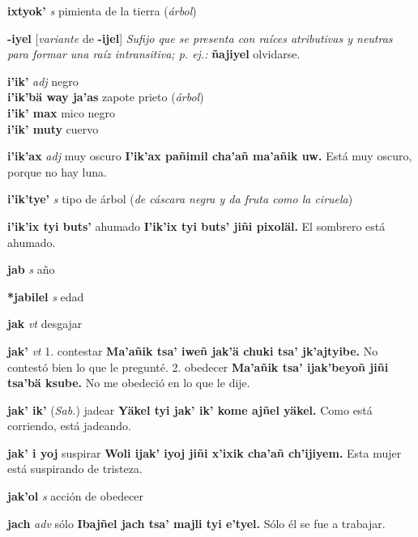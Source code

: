 \documentclass[10pt]{scrbook}
\newcommand{\entry}[1]{\textbf{#1}}
\newcommand{\alphaletter}[1]{\end{multicols}\addsec{#1}\begin{multicols}{2}}
\newcommand{\onedefinition}[1]{#1.}
\newcommand{\nontranslationdef}[1]{\textit{#1}}
\newcommand{\partofspeech}[1]{\textit{#1}}
\newcommand{\spanishtranslation}[1]{#1}
\newcommand{\clarification}[1]{(\textit{#1})}
\newcommand{\cholexample}[1]{\textbf{#1}}
\newcommand{\exampletranslation}[1]{#1}
\newcommand{\relevantdialect}[1]{(\textit{#1})}
\newcommand{\secondaryentry}[1]{\\\textbf{#1}}
\newcommand{\secondtranslation}[1]{#1}
\newcommand{\conjugationtense}[1]{[\textit{#1}}
\newcommand{\conjugationverb}[1]{de \textbf{#1}]}
\begin{document}
\begin{multicols}{2}
\entry{ixtyok'}
\partofspeech{s}
\spanishtranslation{pimienta de la tierra}
\clarification{árbol}

\entry{-iyel}
\conjugationtense{variante}
\conjugationverb{-ijel}
\nontranslationdef{Sufijo que se presenta con raíces atributivas y neutras para formar una raíz intransitiva; p. ej.:}
\cholexample{ñajiyel}
\exampletranslation{olvidarse.}

\entry{i'ik'}
\partofspeech{adj}
\spanishtranslation{negro}
\secondaryentry{i'ik'bä way ja'as}
\secondtranslation{zapote prieto}
\clarification{árbol}
\secondaryentry{i'ik' max}
\secondtranslation{mico negro}
\secondaryentry{i'ik' muty}
\secondtranslation{cuervo}

\entry{i'ik'ax}
\partofspeech{adj}
\spanishtranslation{muy oscuro}
\cholexample{I'ik'ax pañimil cha'añ ma'añik uw.}
\exampletranslation{Está muy oscuro, porque no hay luna.}

\entry{i'ik'tye'}
\partofspeech{s}
\spanishtranslation{tipo de árbol}
\clarification{de cáscara negra y da fruta como la ciruela}

\entry{i'ik'ix tyi buts'}
\spanishtranslation{ahumado}
\cholexample{I'ik'ix tyi buts' jiñi pixoläl.}
\exampletranslation{El sombrero está ahumado.}

\alphaletter{J}

\entry{jab}
\partofspeech{s}
\spanishtranslation{año}

\entry{*jabilel}
\partofspeech{s}
\spanishtranslation{edad}

\entry{jak}
\partofspeech{vt}
\spanishtranslation{desgajar}

\entry{jak'}
\partofspeech{vt}
\onedefinition{1}
\spanishtranslation{contestar}
\cholexample{Ma'añik tsa' iweñ jak'ä chuki tsa' jk'ajtyibe.}
\exampletranslation{No contestó bien lo que le pregunté.}
\onedefinition{2}
\spanishtranslation{obedecer}
\cholexample{Ma'añik tsa' ijak'beyoñ jiñi tsa'bä ksube.}
\exampletranslation{No me obedeció en lo que le dije.}

\entry{jak' ik'}
\relevantdialect{Sab.}
\spanishtranslation{jadear}
\cholexample{Yäkel tyi jak' ik' kome ajñel yäkel.}
\exampletranslation{Como está corriendo, está jadeando.}

\entry{jak' i yoj}
\spanishtranslation{suspirar}
\cholexample{Woli ijak' iyoj jiñi x'ixik cha'añ ch'ijiyem.}
\exampletranslation{Esta mujer está suspirando de tristeza.}

\entry{jak'ol}
\partofspeech{s}
\spanishtranslation{acción de obedecer}

\entry{jach}
\partofspeech{adv}
\spanishtranslation{sólo}
\cholexample{Ibajñel jach tsa' majli tyi e'tyel.}
\exampletranslation{Sólo él se fue a trabajar.}


\end{multicols}
\end{document}
